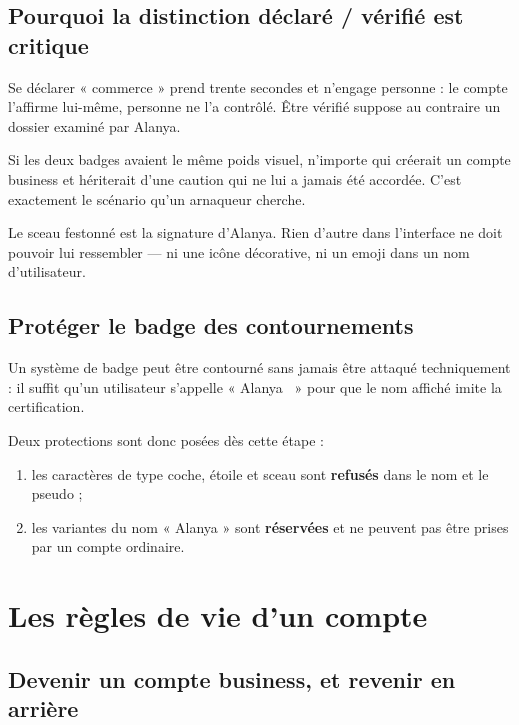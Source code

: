 \section{Pourquoi la distinction déclaré / vérifié est critique}

Se déclarer « commerce » prend trente secondes et n'engage personne : le compte l'affirme
lui-même, personne ne l'a contrôlé. Être vérifié suppose au contraire un dossier examiné
par Alanya.

Si les deux badges avaient le même poids visuel, n'importe qui créerait un compte business
et hériterait d'une caution qui ne lui a jamais été accordée. C'est exactement le scénario
qu'un arnaqueur cherche.

\begin{alerte}
Le sceau festonné est la signature d'Alanya. Rien d'autre dans l'interface ne doit pouvoir lui
ressembler --- ni une icône décorative, ni un emoji dans un nom d'utilisateur.
\end{alerte}

\section{Protéger le badge des contournements}

Un système de badge peut être contourné sans jamais être attaqué techniquement : il suffit
qu'un utilisateur s'appelle « Alanya~\checkmark{} » pour que le nom affiché imite la
certification.

Deux protections sont donc posées dès cette étape :

\begin{enumerate}[leftmargin=1.6em]
  \item les caractères de type coche, étoile et sceau sont \textbf{refusés} dans le nom et
        le pseudo ;
  \item les variantes du nom « Alanya » sont \textbf{réservées} et ne peuvent pas être
        prises par un compte ordinaire.
\end{enumerate}

\chapter{Les règles de vie d'un compte}

\section{Devenir un compte business, et revenir en arrière}

